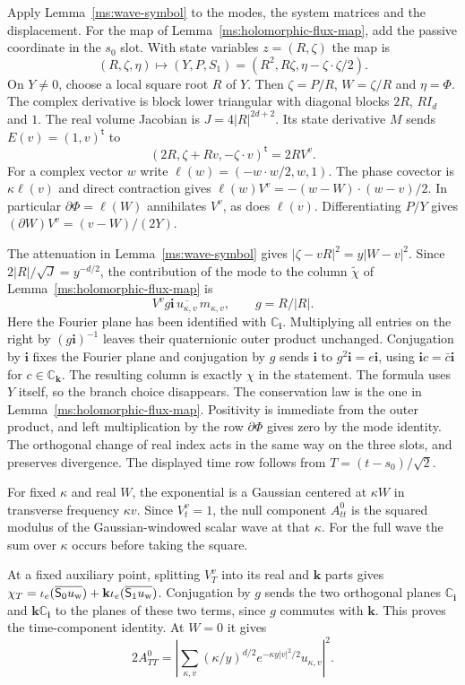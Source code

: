 Apply Lemma~\ref{ms:wave-symbol} to the modes, the system matrices and the displacement. For the map of Lemma~\ref{ms:holomorphic-flux-map}, add the passive coordinate in the $s_0$ slot. With state variables $z=(R,\zeta)$ the map is
\[
(R,\zeta,\eta)\longmapsto(Y,P,S_1)=(R^2,R\zeta,\eta-\zeta\cdot\zeta/2).
\]
On $Y\ne0$, choose a local square root $R$ of $Y$. Then $\zeta=P/R$, $W=\zeta/R$ and $\eta=\Phi$. The complex derivative is block lower triangular with diagonal blocks $2R$, $RI_d$ and $1$. The real volume Jacobian is $J=4|R|^{2d+2}$. Its state derivative $M$ sends $E(v)=(1,v)^{\mathsf t}$ to
\[
(2R,\zeta+Rv,-\zeta\cdot v)^{\mathsf t}=2RV^v.
\]
For a complex vector $w$ write $\ell(w)=(-w\cdot w/2,w,1)$. The phase covector is $\kappa\ell(v)$ and direct contraction gives $\ell(w)V^v=-(w-W)\cdot(w-v)/2$. In particular $\partial\Phi=\ell(W)$ annihilates $V^v$, as does $\ell(v)$. Differentiating $P/Y$ gives $(\partial W)V^v=(v-W)/(2Y)$.

The attenuation in Lemma~\ref{ms:wave-symbol} gives $|\zeta-vR|^2=y|W-v|^2$. Since $2|R|/\sqrt J=y^{-d/2}$, the contribution of the mode to the column $\widetilde\chi$ of Lemma~\ref{ms:holomorphic-flux-map} is
\[
V^v g\mathbf i\,\overline{u_{\kappa,v}}\,m_{\kappa,v},
\qquad g=R/|R|.
\]
Here the Fourier plane has been identified with $\mathbb C_{\mathbf i}$. Multiplying all entries on the right by $(g\mathbf i)^{-1}$ leaves their quaternionic outer product unchanged. Conjugation by $\mathbf i$ fixes the Fourier plane and conjugation by $g$ sends $\mathbf i$ to $g^2\mathbf i=e\mathbf i$, using $\mathbf i c=\bar c\mathbf i$ for $c\in\mathbb C_{\mathbf k}$. The resulting column is exactly $\chi$ in the statement. The formula uses $Y$ itself, so the branch choice disappears. The conservation law is the one in Lemma~\ref{ms:holomorphic-flux-map}. Positivity is immediate from the outer product, and left multiplication by the row $\partial\Phi$ gives zero by the mode identity. The orthogonal change of real index acts in the same way on the three slots, and preserves divergence. The displayed time row follows from $T=(t-s_0)/\sqrt2$.

For fixed $\kappa$ and real $W$, the exponential is a Gaussian centered at $\kappa W$ in transverse frequency $\kappa v$. Since $V_t^v=1$, the null component $A^0_{tt}$ is the squared modulus of the Gaussian-windowed scalar wave at that $\kappa$. For the full wave the sum over $\kappa$ occurs before taking the square.

At a fixed auxiliary point, splitting $V_T^v$ into its real and $\mathbf k$ parts gives $\chi_T=\iota_e(\overline{\mathsf S_0u_{\rm w}})+\mathbf k\iota_e(\overline{\mathsf S_1u_{\rm w}})$. Conjugation by $g$ sends the two orthogonal planes $\mathbb C_{\mathbf i}$ and $\mathbf k\mathbb C_{\mathbf i}$ to the planes of these two terms, since $g$ commutes with $\mathbf k$. This proves the time-component identity. At $W=0$ it gives
\[
2A^0_{TT}=\left|\sum_{\kappa,v}(\kappa/y)^{d/2}
 e^{-\kappa y|v|^2/2}u_{\kappa,v}\right|^2.
\]
